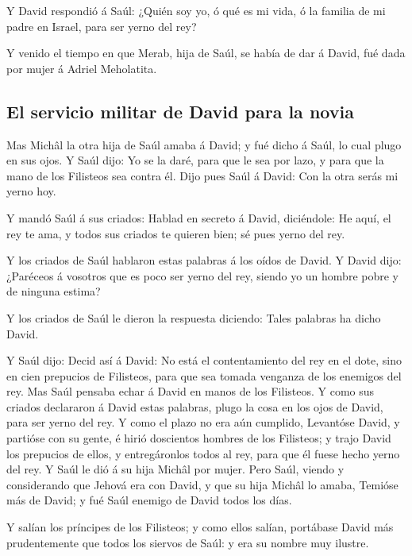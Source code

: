  Y David respondió á Saúl: ¿Quién soy yo, ó qué es mi
vida, ó la familia de mi padre en Israel, para ser yerno del rey?

 Y venido el tiempo en que Merab, hija de Saúl, se había
de dar á David, fué dada por mujer á Adriel Meholatita.

\hypertarget{el-servicio-militar-de-david-para-la-novia}{%
\subsection{El servicio militar de David para la
novia}\label{el-servicio-militar-de-david-para-la-novia}}

 Mas Michâl la otra hija de Saúl amaba á David; y fué
dicho á Saúl, lo cual plugo en sus ojos.  Y Saúl dijo: Yo
se la daré, para que le sea por lazo, y para que la mano de los
Filisteos sea contra él. Dijo pues Saúl á David: Con la otra serás mi
yerno hoy.

 Y mandó Saúl á sus criados: Hablad en secreto á David,
diciéndole: He aquí, el rey te ama, y todos sus criados te quieren bien;
sé pues yerno del rey.

 Y los criados de Saúl hablaron estas palabras á los
oídos de David. Y David dijo: ¿Paréceos á vosotros que es poco ser yerno
del rey, siendo yo un hombre pobre y de ninguna estima?

 Y los criados de Saúl le dieron la respuesta diciendo:
Tales palabras ha dicho David.

 Y Saúl dijo: Decid así á David: No está el
contentamiento del rey en el dote, sino en cien prepucios de Filisteos,
para que sea tomada venganza de los enemigos del rey. Mas Saúl pensaba
echar á David en manos de los Filisteos.  Y como sus
criados declararon á David estas palabras, plugo la cosa en los ojos de
David, para ser yerno del rey. Y como el plazo no era aún cumplido,
 Levantóse David, y partióse con su gente, é hirió
doscientos hombres de los Filisteos; y trajo David los prepucios de
ellos, y entregáronlos todos al rey, para que él fuese hecho yerno del
rey. Y Saúl le dió á su hija Michâl por mujer.  Pero
Saúl, viendo y considerando que Jehová era con David, y que su hija
Michâl lo amaba,  Temióse más de David; y fué Saúl
enemigo de David todos los días.

 Y salían los príncipes de los Filisteos; y como ellos
salían, portábase David más prudentemente que todos los siervos de Saúl:
y era su nombre muy ilustre.

